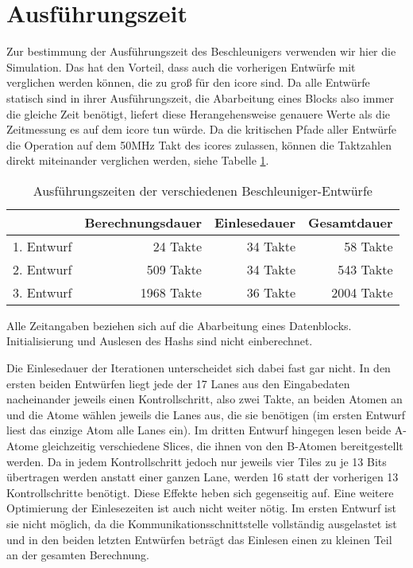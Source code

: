 \section{Ausführungszeit}
Zur bestimmung der Ausführungszeit des Beschleunigers verwenden wir hier die Simulation. Das hat den Vorteil,
dass auch die vorherigen Entwürfe mit verglichen werden können, die zu groß für den icore sind.
Da alle Entwürfe statisch sind in ihrer Ausführungszeit, die Abarbeitung eines Blocks also immer die gleiche Zeit benötigt,
liefert diese Herangehensweise genauere Werte als die Zeitmessung es auf dem icore tun würde.
Da die kritischen Pfade aller Entwürfe die Operation auf dem 50MHz Takt des icores zulassen, können die Taktzahlen direkt miteinander verglichen werden, siehe Tabelle \ref{tab:zeiten_alle_iterationen}.
\begin{table}
    \centering
    \begin{tabular}{lrrr}
        & Berechnungsdauer & Einlesedauer & Gesamtdauer\\
        \hline
        1. Entwurf & 24 Takte & 34 Takte & 58 Takte \\
        2. Entwurf & 509 Takte & 34 Takte & 543 Takte \\
        3. Entwurf & 1968 Takte & 36 Takte & 2004 Takte
    \end{tabular}
    \label{tab:zeiten_alle_iterationen}
    \caption{Ausführungszeiten der verschiedenen Beschleuniger-Entwürfe}
    \small Alle Zeitangaben beziehen sich auf die Abarbeitung eines Datenblocks. Initialisierung und Auslesen des Hashs sind nicht einberechnet.
\end{table}
Die Einlesedauer der Iterationen unterscheidet sich dabei fast gar nicht. In den ersten beiden Entwürfen liegt jede der 17 Lanes aus den Eingabedaten
nacheinander jeweils einen Kontrollschritt, also zwei Takte, an beiden Atomen an und die Atome wählen jeweils die Lanes aus, die sie benötigen
(im ersten Entwurf liest das einzige Atom alle Lanes ein).
Im dritten Entwurf hingegen lesen beide A-Atome gleichzeitig verschiedene Slices, die ihnen von den B-Atomen bereitgestellt werden.
Da in jedem Kontrollschritt jedoch nur jeweils vier Tiles zu je 13 Bits übertragen werden anstatt einer ganzen Lane, werden 16 statt der vorherigen 13 Kontrollschritte benötigt.
Diese Effekte heben sich gegenseitig auf. Eine weitere Optimierung der Einlesezeiten ist auch nicht weiter nötig. Im ersten Entwurf ist sie nicht möglich,
da die Kommunikationsschnittstelle vollständig ausgelastet ist und in den beiden letzten Entwürfen beträgt das Einlesen einen zu kleinen Teil an der gesamten Berechnung.

